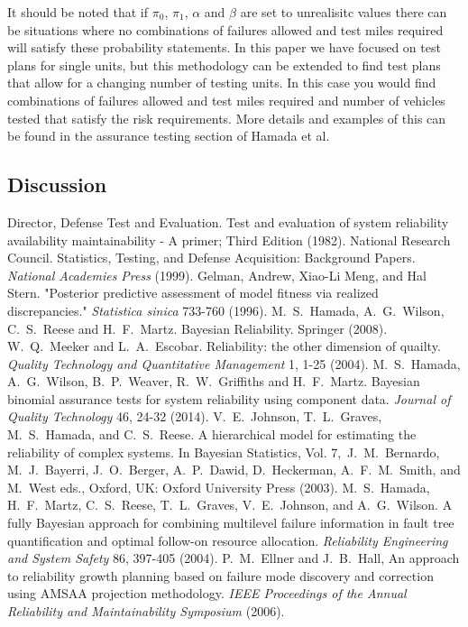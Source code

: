 \documentclass[12pt]{article}
\begin{document}
It should be noted that if $\pi_0$, $\pi_1$, $\alpha$ and $\beta$ are set to
unrealisitc values there can be situations where no combinations of failures
allowed and test miles required will satisfy these probability statements.  In
this paper we have focused on test plans for single units, but this methodology
can be extended to find test plans that allow for a changing number of testing
units.  In this case you would find combinations of failures allowed and test
miles required and number of vehicles tested that satisfy the risk requirements.
More details and examples of this can be found in the assurance testing section
of Hamada et al. ~\cite{ref4}

\subsection{Discussion}

\begin{thebibliography}{99}
 Director, Defense Test and Evaluation. Test and evaluation of
system reliability availability maintainability - A primer; Third Edition
(1982).
 National Research Council. Statistics, Testing, and Defense
Acquisition: Background Papers. \textit{National Academies Press} (1999).
 Gelman, Andrew, Xiao-Li Meng, and Hal Stern. "Posterior
predictive assessment of model fitness via realized discrepancies."
\textit{Statistica sinica} 733-760 (1996).
 M.\ S.\ Hamada, A.\ G.\ Wilson, C.\ S.\ Reese and H.\ F.\ Martz.
Bayesian Reliability. Springer (2008).
 W.\ Q.\ Meeker and L.\ A.\
Escobar. Reliability: the other dimension of quailty. \textit{Quality Technology
and Quantitative Management} 1, 1-25 (2004). \bibitem{HWWGM13} M.\ S.\ Hamada,
A.\ G.\ Wilson, B.\ P.\ Weaver, R.\ W.\ Griffiths and H.\ F.\ Martz. Bayesian
binomial assurance tests for system reliability using component data.
\textit{Journal of Quality Technology} 46, 24-32 (2014).  V.\
E.\ Johnson, T.\ L.\ Graves, M.\ S.\ Hamada, and C.\ S.\ Reese. A hierarchical
model for estimating the reliability of complex systems. In Bayesian Statistics,
Vol. 7,\ J.\ M.\ Bernardo, M.\ J.\ Bayerri, J.\ O.\ Berger, A.\ P.\ Dawid, D.\
Heckerman, A.\ F.\ M.\ Smith, and M.\ West eds., Oxford, UK: Oxford University
Press (2003). \bibitem{HMRGJW04} M.\ S.\ Hamada, H.\ F.\ Martz, C.\ S.\ Reese,
T.\ L.\ Graves, V.\ E.\ Johnson, and A.\ G.\ Wilson. A fully Bayesian approach
for combining multilevel failure information in fault tree quantification and
optimal follow-on resource allocation. \textit{Reliability Engineering and
System Safety} 86, 397-405 (2004). \bibitem{EH06} P.\ M.\ Ellner and J.\ B.\
Hall, An approach to reliability growth planning based on failure mode discovery
and correction using AMSAA projection methodology. \textit{IEEE Proceedings of
the Annual Reliability and Maintainability Symposium} (2006).
\end{thebibliography}
\end{document}
